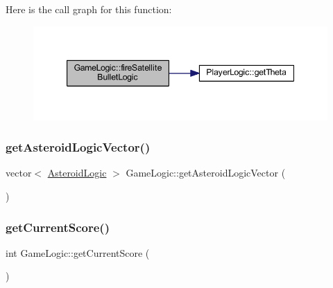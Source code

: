 Here is the call graph for this function\+:
\nopagebreak
\begin{figure}[H]
\begin{center}
\leavevmode
\includegraphics[width=347pt]{class_game_logic_ab84e34d803932a798b76f1c3b8a4af83_cgraph}
\end{center}
\end{figure}
\mbox{\label{class_game_logic_a084386ea39d66e3963ba248f7affabe0}} 
\subsubsection{\texorpdfstring{get\+Asteroid\+Logic\+Vector()}{getAsteroidLogicVector()}}
{\footnotesize\ttfamily vector$<$ \hyperlink{class_asteroid_logic}{Asteroid\+Logic} $>$ Game\+Logic\+::get\+Asteroid\+Logic\+Vector (\begin{DoxyParamCaption}{ }\end{DoxyParamCaption})}

\mbox{\label{class_game_logic_a56e4499d60c8784c3bf34ab91a75e273}} 
\subsubsection{\texorpdfstring{get\+Current\+Score()}{getCurrentScore()}}
{\footnotesize\ttfamily int Game\+Logic\+::get\+Current\+Score (\begin{DoxyParamCaption}{ }\end{DoxyParamCaption})}

